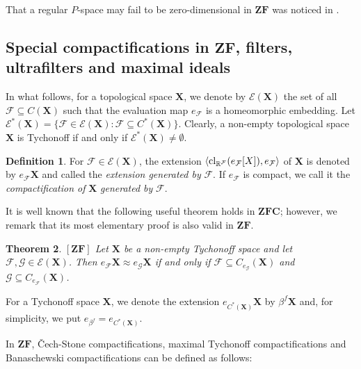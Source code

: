 \documentclass[12pt,twoside,leqno]{article}
\theoremstyle{plain}
\newtheorem{theorem}{Theorem}[section]
\theoremstyle{definition}
\newtheorem{definition}[theorem]{Definition}
\theoremstyle{remark}
\DeclareMathOperator{\cl}{{\rm cl}}
\begin{document}
That a regular $P$-space may fail to be zero-dimensional in $\mathbf{ZF}$ was noticed in \cite{kow}.

\subsection{Special compactifications in $\mathbf{ZF}$, filters, ultrafilters and maximal ideals}
\label{s1.5}

In what follows, for a topological space $\mathbf{X}$, we denote by $\mathcal{E}(\mathbf{X})$ the set of all $\mathcal{F}\subseteq C(\mathbf{X})$ such that the evaluation map $e_{\mathcal{F}}$ is a homeomorphic embedding. Let $\mathcal{E}^{\ast}(\mathbf{X})=\{\mathcal{F}\in\mathcal{E}(\mathbf{X}): \mathcal{F}\subseteq C^{\ast}(\mathbf{X})\}$.  Clearly, a non-empty topological space $\mathbf{X}$ is Tychonoff if and only if $\mathcal{E}^{\ast}(\mathbf{X})\neq\emptyset$. 

\begin{definition}
	\label{s1:d22}
	For $\mathcal{F}\in\mathcal{E}(\mathbf{X})$, the extension $\langle \cl_{\mathbb{R}^{\mathcal{F}}}(e_{\mathcal{F}}[X]), e_{\mathcal{F}}\rangle$ of $\mathbf{X}$ is denoted by $e_{\mathcal{F}}\mathbf{X}$ and called the \emph{extension generated by} $\mathcal{F}$. If $e_{\mathcal{F}}$ is compact, we call it the \emph{compactification of} $\mathbf{X}$ \emph{generated by} $\mathcal{F}$.
\end{definition}

It is well known that the following useful theorem holds in $\mathbf{ZFC}$; however, we remark that its most elementary proof is also valid in $\mathbf{ZF}$.

\begin{theorem}
	\label{s1:t23}
	$[\mathbf{ZF}]$
	Let $\mathbf{X}$ be a non-empty Tychonoff space and let $\mathcal{F},\mathcal{G}\in\mathcal{E}( \mathbf{X})$. Then $e_{\mathcal{F}}\mathbf{X}\approx e_{\mathcal{G}}\mathbf{X}$ if and only if $\mathcal{F}\subseteq C_{e_{\mathcal{G}}}(\mathbf{X})$ and $\mathcal{G}\subseteq C_{e_{\mathcal{F}}}(\mathbf{X})$.
\end{theorem}

For a Tychonoff space $\mathbf{X}$, we denote the extension $e_{C^{\ast}(\mathbf{X})}\mathbf{X}$ by $\beta^{f}\mathbf{X}$ and, for simplicity, we put $e_{\beta^f}=e_{C^{\ast}(\mathbf{X})}$.

In $\mathbf{ZF}$, \v{C}ech-Stone compactifications, maximal Tychonoff compactifications and Banaschewski compactifications can be defined as follows:
\end{document}
